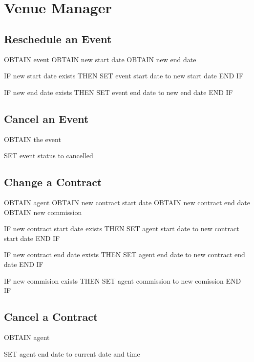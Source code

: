 \section{Venue Manager}

\subsection{Reschedule an Event}
\begin{pc}
OBTAIN event
OBTAIN new start date
OBTAIN new end date

IF new start date exists THEN
    SET event start date to new start date
END IF

IF new end date exists THEN
    SET event end date to new end date
END IF
\end{pc}

\subsection{Cancel an Event}
\begin{pc}
OBTAIN the event

SET event status to cancelled
\end{pc}

\subsection{Change a Contract}
\begin{pc}
OBTAIN agent
OBTAIN new contract start date
OBTAIN new contract end date
OBTAIN new commission

IF new contract start date exists THEN
    SET agent start date to new contract start date
END IF

IF new contract end date exists THEN
    SET agent end date to new contract end date
END IF

IF new commision exists THEN
    SET agent commission to new comission
END IF
\end{pc}

\subsection{Cancel a Contract}
\begin{pc}
OBTAIN agent

SET agent end date to current date and time
\end{pc}

